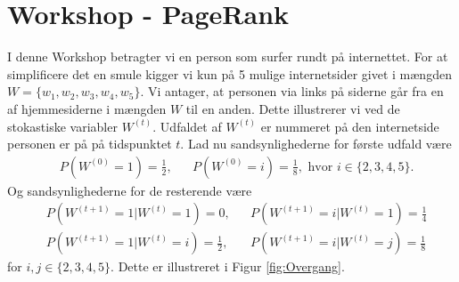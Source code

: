 \documentclass[10pt,a4paper]{article}
\begin{document}
\rhead{\today}

\fancyfoot[R] {\thepage}
\fancyfoot[C] {}
\fancyfoot[L] {} %
\section*{Workshop - PageRank}
I denne Workshop betragter vi en person som surfer rundt på internettet. For at simplificere det en smule kigger vi kun på 5 mulige internetsider givet i mængden $W=\{w_1,w_2,w_3,w_4,w_5\}$. Vi antager, at personen via links på siderne går fra en af hjemmesiderne i mængden $W$ til en anden. Dette illustrerer vi ved de stokastiske variabler $W^{(t)}$. Udfaldet af $W^{(t)}$ er nummeret på den internetside personen er på på tidspunktet $t$. Lad nu sandsynlighederne for første udfald være
\begin{align}\label{eq:startfordeling}
	&P(W^{(0)}=1)=\frac{1}{2}, &&P(W^{(0)}=i)=\frac{1}{8}, \text{ hvor $i\in\{2,3,4,5\}$}.
\end{align}
Og sandsynlighederne for de resterende være
\begin{align*}
	&P(W^{(t+1)}=1|W^{(t)}=1)=0, &&P(W^{(t+1)}=i|W^{(t)}=1)=\frac{1}{4}\\
	&P(W^{(t+1)}=1|W^{(t)}=i)=\frac{1}{2}, &&P(W^{(t+1)}=i|W^{(t)}=j)=\frac{1}{8}
\end{align*}
for $i,j\in \{2,3,4,5\}$.
Dette er illustreret i Figur \ref{fig:Overgang}.
\end{document}
